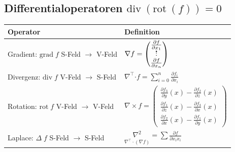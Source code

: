 \documentclass[6pt,a4paper]{scrartcl}
\let\olddot = \dot
\newcommand{\vect}[1]{\ensuremath{\begin{pmatrix} #1 \end{pmatrix}}}							%
\newcommand{\bdot}{\ensuremath{\boldsymbol \cdot}} 												%
\newcommand{\svdots}{\ensuremath{\olddot :}}													%
\renewcommand*{\dot}[1]{\accentset{\mbox{\textrm{\large\bfseries .}} }{#1}}						%
\renewcommand{\div}{\ensuremath{\mathrm{div}\ }}								%
\newcommand{\rot}{\ensuremath{\mathrm{rot}\ }}									%
\begin{document}
\begin{multicols*}{4}
\subsection{Differentialoperatoren \qquad $\div(\rot(f)) = 0$}
\begin{tabular}{l|l}
	Operator & Definition \\ \midrule
	\pbox{2.0cm}{ Gradient: $\mathrm{grad}\; f$ \\ S-Feld $\rightarrow$ V-Feld } & $\nabla f = \vect{\frac{\partial f}{\partial x_1} \\ \svdots \\ \frac{\partial f}{\partial x_n} }$ \\ \midrule
	\pbox{2.0cm}{ Divergenz: $\mathrm{div}\; f$ \\ V-Feld $\rightarrow$ S-Feld } & ${\displaystyle \nabla^\top \bdot f = \sum\limits_{i=0}^n \frac{\partial f_i}{\partial x_i}}$\\ \midrule %
	\pbox{2.0cm}{ Rotation: $\mathrm{rot}\; f$ \\ V-Feld $\rightarrow$ V-Feld } & $\nabla \times f = \vect{\frac{\partial f_3}{\partial y}(x) - \frac{\partial f_2}{\partial z}(x) \\[2pt] \frac{\partial f_1}{\partial z}(x) -\frac{\partial f_3}{\partial x}(x) \\[2pt] \frac{\partial f_2}{\partial x}(x) -\frac{\partial f_1}{\partial y}(x) }$ \\ \midrule
	\pbox{2.0cm}{ Laplace: $\Delta\; f$ \\ S-Feld $\rightarrow$ S-Feld } & ${\displaystyle\underset{\nabla^\top \cdot (\nabla f)}{\nabla^2} = \sum \frac{\partial f}{\partial x_i x_i} }$ %
\end{tabular}



\end{multicols*}
\end{document}
